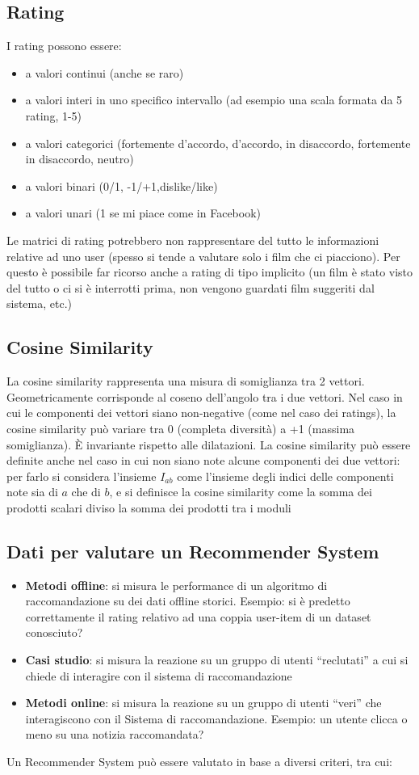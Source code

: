 \documentclass[12pt]{article}
\begin{document}
\subsection{Rating}
I rating possono essere:
\begin{itemize}
    \item a valori continui (anche se raro)
    \item a valori interi in uno specifico intervallo (ad esempio una scala formata da 5 rating, 1-5)
    \item a valori categorici (fortemente d’accordo, d’accordo, in disaccordo, fortemente in disaccordo, neutro)
    \item a valori binari (0/1, -1/+1,dislike/like)
    \item a valori unari (1 se mi piace come in Facebook)
\end{itemize}
Le matrici di rating potrebbero non rappresentare del tutto le informazioni relative ad uno user (spesso si tende a valutare solo i film che ci piacciono). Per questo è possibile far ricorso anche a rating di tipo implicito (un film è stato visto del tutto o ci si è interrotti prima, non vengono guardati film suggeriti dal sistema, etc.)
\subsection{Cosine Similarity}
La cosine similarity rappresenta una misura di somiglianza tra 2 vettori.
Geometricamente corrisponde al coseno dell’angolo tra i due vettori. Nel caso in cui le componenti dei vettori siano non-negative (come nel caso
dei ratings), la cosine similarity può variare tra 0 (completa diversità) a +1 (massima somiglianza). È invariante rispetto alle dilatazioni. La cosine similarity può essere definite anche nel caso in cui non siano note alcune componenti dei due vettori: per farlo si considera l’insieme $I_{ab}$ come l’insieme degli indici delle componenti note sia di $a$ che di $b$, e si definisce la cosine similarity come la somma dei prodotti scalari diviso la somma dei prodotti tra i moduli
\subsection{Dati per valutare un Recommender System}
\begin{itemize}
    \item \textbf{Metodi offline}: si misura le performance di un algoritmo di raccomandazione su dei dati offline storici. Esempio: si è predetto correttamente il rating relativo ad una coppia user-item di un dataset conosciuto?
    \item \textbf{Casi studio}: si misura la reazione su un gruppo di utenti “reclutati” a cui si chiede di interagire con il sistema di raccomandazione
    \item \textbf{Metodi online}: si misura la reazione su un gruppo di utenti “veri” che interagiscono con il Sistema di raccomandazione. Esempio: un utente clicca o meno su una notizia raccomandata?
\end{itemize}
Un Recommender System può essere valutato in base a diversi criteri, tra cui:
\end{document}
